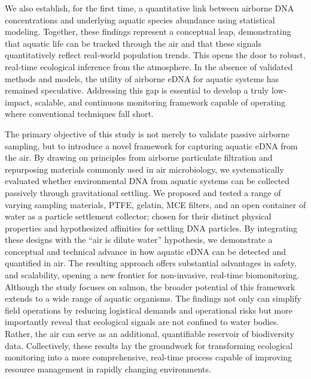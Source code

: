 \documentclass{article}
\begin{document}
We also establish, for the first time, a quantitative link between airborne DNA concentrations and underlying aquatic species abundance using statistical modeling. Together, these findings represent a conceptual leap, demonstrating that aquatic life can be tracked through the air and that these signals quantitatively reflect real-world population trends. This opens the door to robust, real-time ecological inference from the atmosphere. In the absence of validated methods and models, the utility of airborne eDNA for aquatic systems has remained speculative. Addressing this gap is essential to develop a truly low-impact, scalable, and continuous monitoring framework capable of operating where conventional techniques fall short.

The primary objective of this study is not merely to validate passive airborne sampling, but to introduce a novel framework for capturing aquatic eDNA from the air. By drawing on principles from airborne particulate filtration and repurposing materials commonly used in air microbiology, we systematically evaluated whether environmental DNA from aquatic systems can be collected passively through gravitational settling. We proposed and tested a range of varying sampling materials, PTFE, gelatin, MCE filters, and an open container of water as a particle settlement collector; chosen for their distinct physical properties and hypothesized affinities for settling DNA particles. By integrating these designs with the “air is dilute water” hypothesis, we demonstrate a conceptual and technical advance in how aquatic eDNA can be detected and quantified in air. The resulting approach offers substantial advantages in safety, and scalability, opening a new frontier for non-invasive, real-time biomonitoring. Although the study focuses on salmon, the broader potential of this framework extends to a wide range of aquatic organisms. The findings not only can simplify field operations by reducing logistical demands and operational risks but more importantly reveal that ecological signals are not confined to water bodies. Rather, the air can serve as an additional, quantifiable reservoir of biodiversity data. Collectively, these results lay the groundwork for transforming ecological monitoring into a more comprehensive, real-time process capable of improving resource management in rapidly changing environments.
\end{document}
